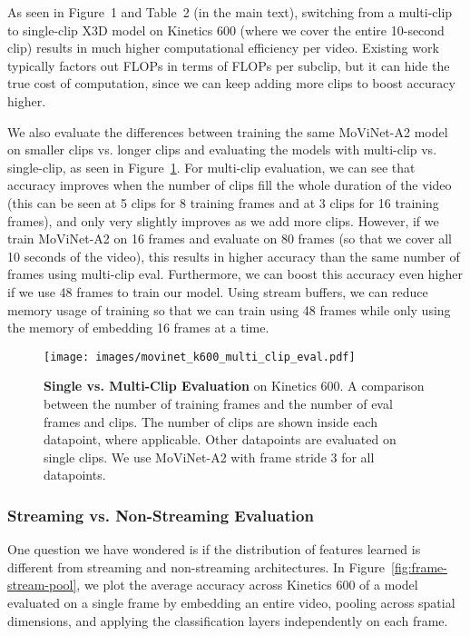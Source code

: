 \documentclass[final]{cvpr}
\newcommand{\ournet}{MoViNet\xspace} \newcommand{\ournets}{\ournet{}s\xspace}
\begin{document}
As seen in Figure~1 and Table~2 (in the main text), switching from a multi-clip to single-clip X3D model on Kinetics 600 (where we cover the entire 10-second clip) results in much higher computational efficiency per video.
Existing work typically factors out FLOPs in terms of FLOPs per subclip, but it can hide the true cost of computation, since we can keep adding more clips to boost accuracy higher.

We also evaluate the differences between training the same \ournet-A2 model on smaller clips vs. longer clips and evaluating the models with multi-clip vs. single-clip, as seen in Figure~\ref{fig:single-vs-multi-clip}.
For multi-clip evaluation, we can see that accuracy improves when the number of clips fill the whole duration of the video (this can be seen at 5 clips for 8 training frames and at 3 clips for 16 training frames), and only very slightly improves as we add more clips.
However, if we train \ournet-A2 on 16 frames and evaluate on 80 frames (so that we cover all 10 seconds of the video), this results in higher accuracy than the same number of frames using multi-clip eval.
Furthermore, we can boost this accuracy even higher if we use 48 frames to train our model.
Using stream buffers, we can reduce memory usage of training so that we can train using 48 frames while only using the memory of embedding 16 frames at a time.

\begin{figure}[t]
    \begin{center}
    \texttt{[image: images/movinet\_k600\_multi\_clip\_eval.pdf]}
    \end{center}
    \caption{
        {\bf Single vs. Multi-Clip Evaluation} on Kinetics 600.
        A comparison between the number of training frames and the number of eval frames and clips.
        The number of clips are shown inside each datapoint, where applicable.
        Other datapoints are evaluated on single clips.
        We use \ournet-A2 with frame stride 3 for all datapoints.
    }
    \label{fig:single-vs-multi-clip}
\end{figure}


\subsubsection{Streaming vs. Non-Streaming Evaluation}

One question we have wondered is if the distribution of features learned is different from streaming and non-streaming architectures.
In Figure~\ref{fig:frame-stream-pool}, we plot the average accuracy across Kinetics 600 of a model evaluated on a single frame by embedding an entire video, pooling across spatial dimensions, and applying the classification layers independently on each frame.
\end{document}
